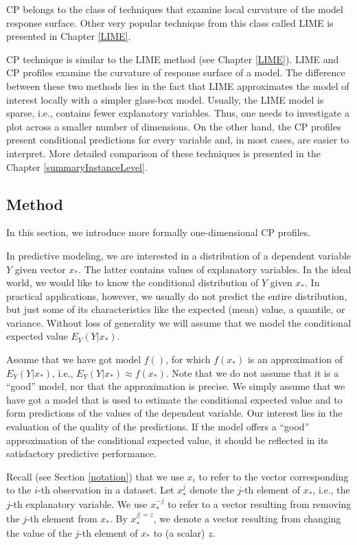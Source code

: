 \documentclass[12pt,]{krantz}
\begin{document}
CP belongs to the class of techniques that examine local curvature of the model response surface. Other very popular technique from this class called LIME is presented in Chapter \ref{LIME}.

CP technique is similar to the LIME method (see Chapter \ref{LIME}). LIME and CP profiles examine the curvature of response surface of a model. The difference between these two methods lies in the fact that LIME approximates the model of interest locally with a simpler glass-box model. Usually, the LIME model is sparse, i.e., contains fewer explanatory variables. Thus, one needs to investigate a plot across a smaller number of dimensions. On the other hand, the CP profiles present conditional predictions for every variable and, in most cases, are easier to interpret. More detailed comparison of these techniques is presented in the Chapter \ref{summaryInstanceLevel}.

\hypertarget{CPMethod}{%
\subsection{Method}\label{CPMethod}}

In this section, we introduce more formally one-dimensional CP profiles.

In predictive modeling, we are interested in a distribution of a dependent variable \(Y\) given vector \(x_*\). The latter contains values of explanatory variables. In the ideal world, we would like to know the conditional distribution of \(Y\) given \(x_*\). In practical applications, however, we usually do not predict the entire distribution, but just some of its characteristics like the expected (mean) value, a quantile, or variance. Without loss of generality we will assume that we model the conditional expected value \(E_Y(Y | x_*)\).

Assume that we have got model \(f()\), for which \(f(x_*)\) is an approximation of \(E_Y(Y | x_*)\), i.e., \(E_Y(Y | x_*) \approx f(x_*)\). Note that we do not assume that it is a ``good'' model, nor that the approximation is precise. We simply assume that we have got a model that is used to estimate the conditional expected value and to form predictions of the values of the dependent variable. Our interest lies in the evaluation of the quality of the predictions. If the model offers a ``good'' approximation of the conditional expected value, it should be reflected in its satisfactory predictive performance.

Recall (see Section \ref{notation}) that we use \(x_i\) to refer to the vector corresponding to the \(i\)-th observation in a dataset. Let \(x^{j}_{*}\) denote the \(j\)-th element of \(x_{*}\), i.e., the \(j\)-th explanatory variable. We use \(x^{-j}_{*}\) to refer to a vector resulting from removing the \(j\)-th element from \(x_{*}\). By \(x^{j|=z}_{*}\), we denote a vector resulting from changing the value of the \(j\)-th element of \(x_{*}\) to (a scalar) \(z\).
\end{document}
